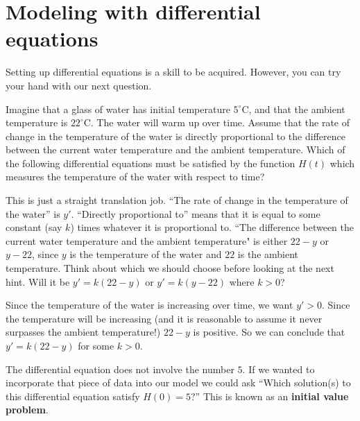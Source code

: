 \documentclass{ximera}
\begin{document}
\section{Modeling with differential equations}

Setting up differential equations is a skill to be acquired. However,
you can try your hand with our next question.

\begin{question}
  Imagine that a glass of water has initial temperature $5^\circ
  \mathrm{C}$, and that the ambient temperature is $22^\circ \mathrm{C}$.
  The water will warm up over time.  Assume that the rate of change in
  the temperature of the water is directly proportional to the
  difference between the current water temperature and the ambient
  temperature.  Which of the following differential equations must be
  satisfied by the function $H(t)$ which measures the temperature of
  the water with respect to time?
  \begin{multipleChoice}
  \end{multipleChoice}
  \begin{hint}
    This is just a straight translation job.  ``The rate of change in
    the temperature of the water'' is $y'$.  ``Directly proportional
    to'' means that it is equal to some constant (say $k$) times
    whatever it is proportional to.  ``The difference between the
    current water temperature and the ambient temperature" is either
    $22-y$ or $y-22$, since $y$ is the temperature of the water and
    $22$ is the ambient temperature.  Think about which we should
    choose before looking at the next hint.  Will it be $y'=k(22-y)$
    or $y'=k(y-22)$ where $k>0$?
  \end{hint}
  \begin{hint}
    Since the temperature of the water is increasing over time, we
    want $y'>0$.  Since the temperature will be increasing (and it is
    reasonable to assume it never surpasses the ambient temperature!)
    $22-y$ is positive.  So we can conclude that $y' = k(22-y)$ for
    some $k>0$.
  \end{hint}
  
  \begin{feedback}
    The differential equation does not involve the number $5$.  If we
    wanted to incorporate that piece of data into our model we could
    ask ``Which solution(s) to this differential equation satisfy
    $H(0) = 5$?''  This is known as an \textbf{initial value problem}.  %
  \end{feedback}
\end{question}
\end{document}
